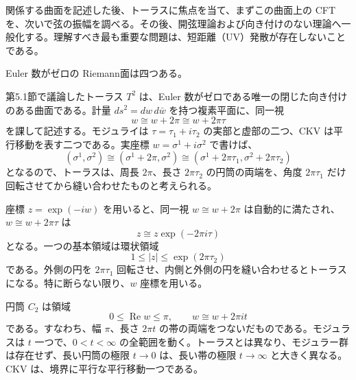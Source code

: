 \label{ch:7}

関係する曲面を記述した後、トーラスに焦点を当て、まずこの曲面上の CFT を、次いで弦の振幅を調べる。その後、開弦理論および向き付けのない理論へ一般化する。理解すべき最も重要な問題は、短距離（UV）発散が存在しないことである。


Euler 数がゼロの Riemann面は四つある。


第5.1節で議論したトーラス $T^2$ は、Euler 数がゼロである唯一の閉じた向き付けのある曲面である。計量 $ds^2=dw\,d\bar w$ を持つ複素平面に、同一視
\begin{equation}
w\cong w+2\pi\cong w+2\pi\tau
\tag{7.1.1}\label{eq:7.1.1}
\end{equation}
を課して記述する。モジュライは $\tau=\tau_1+i\tau_2$ の実部と虚部の二つ、CKV は平行移動を表す二つである。実座標 $w=\sigma^1+i\sigma^2$ で書けば、
\begin{equation}
(\sigma^1,\sigma^2)\cong(\sigma^1+2\pi,\sigma^2)
\cong(\sigma^1+2\pi\tau_1,\sigma^2+2\pi\tau_2)
\tag{7.1.2}\label{eq:7.1.2}
\end{equation}
となるので、トーラスは、周長 $2\pi$、長さ $2\pi\tau_2$ の円筒の両端を、角度 $2\pi\tau_1$ だけ回転させてから縫い合わせたものと考えられる。

座標 $z=\exp(-iw)$ を用いると、同一視 $w\cong w+2\pi$ は自動的に満たされ、$w\cong w+2\pi\tau$ は
\begin{equation}
z\cong z\exp(-2\pi i\tau)
\tag{7.1.3}\label{eq:7.1.3}
\end{equation}
となる。一つの基本領域は環状領域
\begin{equation}
1\leq |z|\leq\exp(2\pi\tau_2)
\tag{7.1.4}\label{eq:7.1.4}
\end{equation}
である。外側の円を $2\pi\tau_1$ 回転させ、内側と外側の円を縫い合わせるとトーラスになる。特に断らない限り、$w$ 座標を用いる。


円筒 $C_2$ は領域
\begin{equation}
0\leq\operatorname{Re}w\leq\pi,\qquad w\cong w+2\pi it
\tag{7.1.5}\label{eq:7.1.5}
\end{equation}
である。すなわち、幅 $\pi$、長さ $2\pi t$ の帯の両端をつないだものである。モジュラスは $t$ 一つで、$0<t<\infty$ の全範囲を動く。トーラスとは異なり、モジュラー群は存在せず、長い円筒の極限 $t\to0$ は、長い帯の極限 $t\to\infty$ と大きく異なる。CKV は、境界に平行な平行移動一つである。

